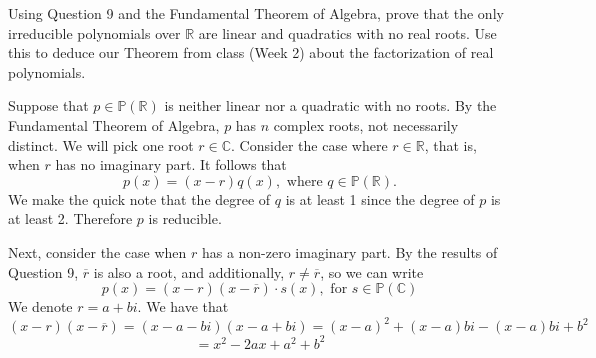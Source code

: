 \documentclass{article}
\theoremstyle{plain} %
\numberwithin{thm}{section} %
\theoremstyle{definition}
\begin{document}
    \begin{question}{10}
        Using Question 9 and the Fundamental Theorem of Algebra, prove that the only irreducible 
        polynomials over $\mathbb{R}$ are linear and quadratics with no real roots. Use this to deduce our Theorem from class (Week 2) about the factorization of real polynomials.

        \tcblower

        Suppose that \(p \in \mathbb{P}(\mathbb{R})\) is neither linear nor a quadratic with no roots. By the Fundamental Theorem of Algebra, \(p\) has \(n\) complex roots, not necessarily distinct. We will pick one root \(r \in \mathbb{C}\). Consider the case where \(r \in \mathbb{R}\), that is, when \(r\) has no imaginary part. It follows that
        \[
            p(x) = (x - r)q(x), \text{ where } q \in \mathbb{P} (\mathbb{R}).
        \]
        We make the quick note that the degree of \(q\) is at least 1 since the degree of \(p\) is at least 2. Therefore \(p\) is reducible.
        
        Next, consider the case when \(r\) has a non-zero imaginary part. By the results of Question 9, \(\overline{r}\) is also a root, and additionally, \(r \neq \overline{r}\), so we can write
        \[
            p(x) = (x - r)(x - \overline{r})\cdot s(x), \text{ for } s \in \mathbb{P}(\mathbb{C})
        \]
        We denote \(r = a + bi\). We have that
        \[
            (x - r)(x - \overline{r}) = (x - a - bi)(x - a + bi) = (x - a)^2 + (x - a)bi - (x - a)bi + b^2
        \]
        \[
            = x^2 - 2ax + a^2 + b^2
        \]
    \end{question}
\end{document}
